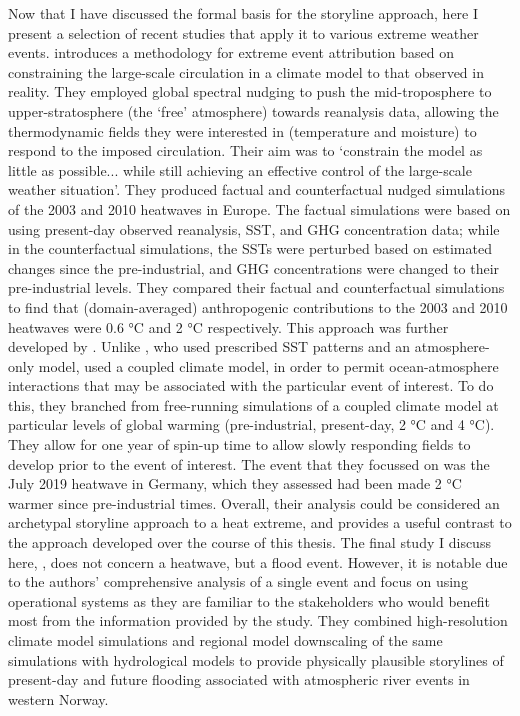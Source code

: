     Now that I have discussed the formal basis for the storyline approach, here I present a selection of recent studies that apply it to various extreme weather events. \citet{van_garderen_methodology_2021} introduces a methodology for extreme event attribution based on constraining the large-scale circulation in a climate model to that observed in reality. They employed global spectral nudging to push the mid-troposphere to upper-stratosphere (the `free' atmosphere) towards reanalysis data, allowing the thermodynamic fields they were interested in (temperature and moisture) to respond to the imposed circulation. Their aim was to `constrain the model as little as possible... while still achieving an effective control of the large-scale weather situation'. They produced factual and counterfactual nudged simulations of the 2003 and 2010 heatwaves in Europe. The factual simulations were based on using present-day observed reanalysis, SST, and GHG concentration data; while in the counterfactual simulations, the SSTs were perturbed based on estimated changes since the pre-industrial, and GHG concentrations were changed to their pre-industrial levels. They compared their factual and counterfactual simulations to find that (domain-averaged) anthropogenic contributions to the 2003 and 2010 heatwaves were 0.6 °C and 2 °C respectively. This approach was further developed by \citet{benitez_july_2022}. Unlike \citet{van_garderen_methodology_2021}, who used prescribed SST patterns and an atmosphere-only model, \citeauthor{benitez_july_2022} used a coupled climate model, in order to permit ocean-atmosphere interactions that may be associated with the particular event of interest. To do this, they branched from free-running simulations of a coupled climate model at particular levels of global warming (pre-industrial, present-day, 2 °C and 4 °C). They allow for one year of spin-up time to allow slowly responding fields to develop prior to the event of interest. The event that they focussed on was the July 2019 heatwave in Germany, which they assessed had been made 2 °C warmer since pre-industrial times. Overall, their analysis could be considered an archetypal storyline approach to a heat extreme, and provides a useful contrast to the approach developed over the course of this thesis. The final study I discuss here, \citet{schaller_role_2020}, does not concern a heatwave, but a flood event. However, it is notable due to the authors' comprehensive analysis of a single event and focus on using operational systems as they are familiar to the stakeholders who would benefit most from the information provided by the study. They combined high-resolution climate model simulations and regional model downscaling of the same simulations with hydrological models to provide physically plausible storylines of present-day and future flooding associated with atmospheric river events in western Norway. 
    
